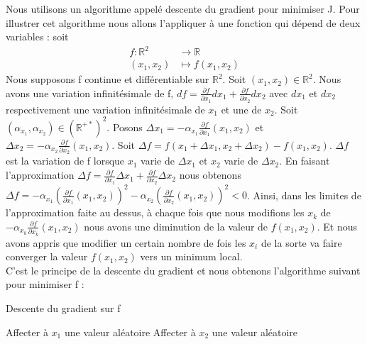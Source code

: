 \documentclass[a4paper,10pt]{article}
\begin{document}
Nous utilisons un algorithme appelé descente du gradient pour minimiser J. Pour illustrer cet algorithme nous allons l'appliquer à une fonction qui dépend de deux variables : soit
\begin{align*}
f\colon \mathbb{R}^2&\longrightarrow \mathbb{R}\\
(x_1, x_2)&\longmapsto f(x_1, x_2)
\end{align*}
Nous supposons f continue et différentiable sur $\mathbb{R}^2$.
Soit $(x_1, x_2) \in \mathbb{R}^2$. Nous avons une variation infinitésimale de f, $df = \frac{\partial f}{\partial x_{1}}d x_{1} + \frac{\partial f}{\partial x_{2}}dx_{2}$ avec $dx_1$ et $dx_2$ respectivement une variation infinitésimale de $x_1$ et une de $x_2$. 
Soit $(\alpha_{x_1}, \alpha_{x_2}) \in (\mathbb{R}^{+*})^2$. 
 Posons $\Delta x_{1} = -\alpha_{x_1} \frac{\partial f}{\partial x_{1}}(x_1, x_2)$
 et $\Delta x_{2} = -\alpha_{x_2} \frac{\partial f}{\partial x_{2}}(x_1, x_2)$. Soit $\Delta f = f(x_1 + \Delta x_1, x_2 + \Delta x_2) - f(x_1, x_2)$. $\Delta f$ est la variation de f lorsque $x_1$ varie de $\Delta x_1$ et $x_2$ varie de $\Delta x_2$. 
En faisant l'approximation $\Delta f = \frac{\partial f}{\partial x_{1}}\Delta  x_{1} + \frac{\partial f}{\partial x_{2}}\Delta x_{2}$ nous obtenons $\Delta f = -\alpha_{x_1} (\frac{\partial f}{\partial x_{1}}(x_1, x_2))^{2} - \alpha_{x_2} (\frac{\partial f}{\partial x_{2}}(x_1, x_2))^{2} < 0$.
Ainsi, dans les limites de l'approximation faite au dessus, à chaque fois que nous modifions les $x_{k}$ de $- \alpha_{x_k} \frac{\partial f}{\partial x_{k}}(x_1, x_2)$
 nous avons une diminution de la valeur de $f(x_1, x_2)$. Et nous avons appris que modifier un certain nombre de fois les $x_i$ de la sorte va faire converger la valeur $f(x_1, x_2)$ vers un minimum local\cite{mooc}.\\

C'est le principe de la descente du gradient et nous obtenons l'algorithme suivant pour minimiser f :
\begin{algorithm}
\caption{Descente du gradient sur f}
\BlankLine
Affecter à $x_1$ une valeur aléatoire\;
Affecter à $x_2$ une valeur aléatoire\;
\BlankLine
\end{algorithm}
\end{document}
